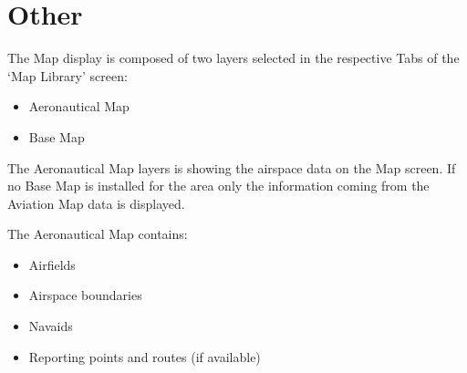 \documentclass[letterpaper,10pt,english]{sphinxmanual}
\begin{document}
\chapter{Other}
\label{\detokenize{03-reference/map_data:other}}
\sphinxAtStartPar
The Map display is composed of two layers selected in the respective Tabs of the
‘Map Library’ screen:
\begin{itemize}
\item {} 
\sphinxAtStartPar
Aeronautical Map

\item {} 
\sphinxAtStartPar
Base Map

\end{itemize}

\sphinxAtStartPar
{}

\sphinxAtStartPar
The Aeronautical Map layers is showing the airspace data on the Map screen. If
no Base Map is installed for the area only the information coming from the
Aviation Map data is displayed.

\sphinxAtStartPar
The Aeronautical Map contains:
\begin{itemize}
\item {} 
\sphinxAtStartPar
Airfields

\item {} 
\sphinxAtStartPar
Airspace boundaries

\item {} 
\sphinxAtStartPar
Navaids

\item {} 
\sphinxAtStartPar
Reporting points and routes (if available)

\end{itemize}
\end{document}
